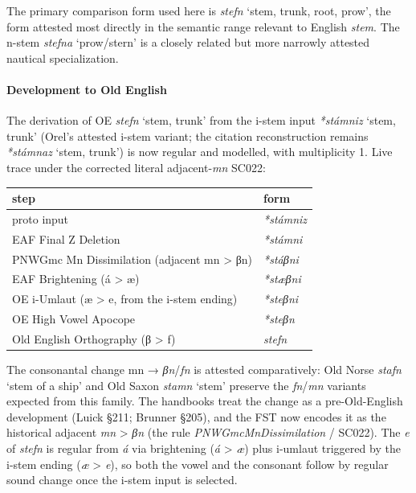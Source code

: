 \documentclass[
  british,
  a4paper,
]{article}
\newcounter{none} %
\providecommand{\Recon}[1]{\emph{*#1}}
\begin{document}
The primary comparison form used here is {\emph{stefn}} `stem, trunk,
root, prow', the form attested most directly in the semantic range
relevant to English \emph{stem}. The n-stem {\emph{stefna}} `prow/stern'
is a closely related but more narrowly attested nautical specialization.

\paragraph{Development to Old
English}\label{development-to-old-english-106}

The derivation of OE {\emph{stefn}} `stem, trunk' from the i-stem input
\Recon{stámniz} `stem, trunk' (Orel's attested i-stem variant; the
citation reconstruction remains \Recon{stámnaz} `stem, trunk') is now
regular and modelled, with multiplicity 1. Live trace under the
corrected literal adjacent-\emph{mn} SC022:

{\def\LTcaptype{none} %
\begin{longtable}[]{@{}ll@{}}
\toprule\noalign{}
step & form \\
\midrule\noalign{}
\endhead
\bottomrule\noalign{}
\endlastfoot
proto input & \emph{*stámniz} \\
EAF Final Z Deletion & \emph{*stámni} \\
PNWGmc Mn Dissimilation (adjacent mn \textgreater{} βn) &
\emph{*stáβni} \\
EAF Brightening (á \textgreater{} æ) & \emph{*stæβni} \\
OE i-Umlaut (æ \textgreater{} e, from the i-stem ending) &
\emph{*steβni} \\
OE High Vowel Apocope & \emph{*steβn} \\
Old English Orthography (β \textgreater{} f) & \emph{stefn} \\
\end{longtable}
}

The consonantal change mn → \emph{βn}/\emph{fn} is attested
comparatively: Old Norse {\emph{stafn}} `stem of a ship' and Old Saxon
{\emph{stamn}} `stem' preserve the \emph{fn}/\emph{mn} variants expected
from this family. The handbooks treat the change as a pre-Old-English
development (Luick §211; Brunner §205), and the FST now encodes it as
the historical adjacent \emph{mn} \textgreater{} \emph{βn} (the rule
\emph{PNWGmcMnDissimilation} / SC022). The \emph{e} of \emph{stefn} is
regular from \emph{á} via brightening (\emph{á} \textgreater{} \emph{æ})
plus i-umlaut triggered by the i-stem ending (\emph{æ} \textgreater{}
\emph{e}), so both the vowel and the consonant follow by regular sound
change once the i-stem input is selected.
\end{document}
